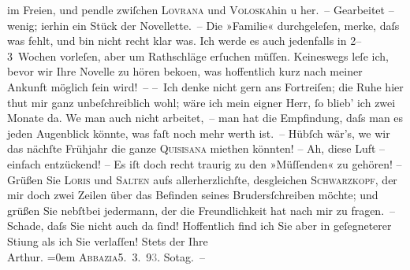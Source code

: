 \begin{ledgroupsized}[t]{13cm}
               im Freien, und pendle zwiſchen \textsc{Lovrana} und \textsc{Voloska}hin u her. – Gearbeitet – wenig; i{\geminationm}erhin ein Stück der Novellette. – Die »Familie« durchgeleſen, merke, daſs was fehlt, und bin nicht recht klar was.
               Ich werde es auch jedenfalls in 2–3 Wochen vorleſen, aber um Rathschläge erſuchen
               müſſen. Keineswegs leſe ich, bevor wir Ihre Novelle zu hören beko{\geminationm}en, was
               hoffentlich kurz nach meiner Ankunft möglich ſein wird! –\pend
           \pstart
           – Ich denke nicht gern ans Fortreiſen; die Ruhe hier thut mir ganz unbeſchreiblich
               wohl; wäre ich mein eigner Herr, ſo blieb’ ich zwei Monate da. We{\geminationn} man auch nicht {\pb}arbeitet, – man hat die Empfindung, daſs man es jeden Augenblick könnte, was faſt
               noch mehr werth ist. – Hübſch wär’s, we{\geminationn} wir das nächſte
               Frühjahr die ganze \textsc{Quisisana} miethen könnten! – Ah, diese Luft – einfach entzückend! – Es iſt doch recht
               traurig zu den »Müſſenden« zu gehören! –\pend
           \pstart
           Grüßen Sie \textsc{Loris} und \textsc{Salten} aufs allerherzlichſte, desgleichen \textsc{Schwarzkopf}, der mir doch zwei Zeilen über das Befinden seines Brudersſchreiben möchte; und grüßen Sie nebſtbei
               jedermann, der die Freundlichkeit hat nach mir zu fragen. – Schade, daſs {\pb}Sie nicht auch da ſind! Hoffentlich find ich Sie aber
               in geſegneterer Sti{\geminationm}ung als ich Sie verlaſſen!\pend
           \pstart
           Stets der Ihre{\\[\baselineskip]}\spacefill\mbox{Arthur.}\pend
           \leftskip=0em{}\pstart
           \textsc{Abbazia}5. 3. 9\textcolor{gray}{3}. So{\geminationn}tag. –\pend
           

\end{ledgroupsized}
